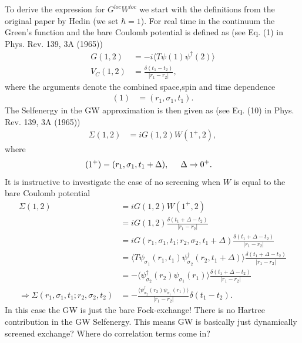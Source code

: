 \documentclass[12pt,a4paper]{scrartcl}
\numberwithin{equation}{section}
\begin{document}
To derive the expression for $G^{loc}W^{loc}$ we start with the definitions
from the original paper by Hedin (we set $\hbar=1$).
For real time in the continuum the Green's function and
the bare Coulomb potential is defined as (see Eq. (1) in Phys. Rev. 139, 3A (1965))
\begin{align}
G(1,2) &= -i \langle T \psi(1)\psi^{\dagger}(2) \rangle \\
V_C(1,2) &= \frac{\delta(t_1-t_2)}{|r_1-r_2|},
\end{align}
where the arguments denote the combined space,spin and time dependence
\begin{align}
 (1) &= (r_1,\sigma_1,t_1).
\end{align}
The Selfenergy in the GW approximation is then given as
(see Eq. (10) in Phys. Rev. 139, 3A (1965))
\begin{align}
 \Sigma(1,2) &= i G(1,2)W(1^+,2),
\end{align}
where
\begin{align}
 (1^+) &= (r_1,\sigma_1,t_1+\Delta), \hspace{0.5cm} \Delta\rightarrow 0^+.
\end{align}
It is instructive to investigate the case of no screening when 
$W$ is equal to the bare Coulomb potential
\begin{align}
 \Sigma(1,2) &= i G(1,2)W(1^+,2)                      \\
 &= i G(1,2) \frac{\delta(t_1+\Delta-t_2)}{|r_1-r_2|}  \\
 &= i G(r_1,\sigma_1,t_1;r_2,\sigma_2,t_1+\Delta) \frac{\delta(t_1+\Delta-t_2)}{|r_1-r_2|}  \\
 &= \langle T \psi_{\sigma_1}(r_1,t_1)\psi^{\dagger}_{\sigma_2}(r_2,t_1+\Delta) \rangle \frac{\delta(t_1+\Delta-t_2)}{|r_1-r_2|}  \\
 &= -\langle \psi^{\dagger}_{\sigma_2}(r_2)\psi_{\sigma_1}(r_1) \rangle \frac{\delta(t_1+\Delta-t_2)}{|r_1-r_2|}  \\
\Rightarrow \Sigma(r_1,\sigma_1,t_1;r_2,\sigma_2,t_2)
&= -\frac{\langle \psi^{\dagger}_{\sigma_2}(r_2)\psi_{\sigma_1}(r_1) \rangle }{|r_1-r_2|}\delta(t_1-t_2) .
\end{align}
In this case the GW is just the bare Fock-exchange!
There is no Hartree contribution in the GW Selfenergy.
This means GW is basically just dynamically screened
exchange? Where do correlation terms come in?
\end{document}
